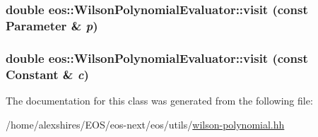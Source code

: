 \label{classeos_1_1WilsonPolynomialEvaluator_a9c91165808b2aee3c8a0db64a99f5c7c}
\hypertarget{classeos_1_1WilsonPolynomialEvaluator_a380ced036f68d89cdf3edde705a32813}{
\subsubsection[{visit}]{\setlength{\rightskip}{0pt plus 5cm}double eos::WilsonPolynomialEvaluator::visit (const {\bf Parameter} \& {\em p})}}
\label{classeos_1_1WilsonPolynomialEvaluator_a380ced036f68d89cdf3edde705a32813}
\hypertarget{classeos_1_1WilsonPolynomialEvaluator_ac85d91d12ce34c628012f7e4ee451359}{
\subsubsection[{visit}]{\setlength{\rightskip}{0pt plus 5cm}double eos::WilsonPolynomialEvaluator::visit (const Constant \& {\em c})}}
\label{classeos_1_1WilsonPolynomialEvaluator_ac85d91d12ce34c628012f7e4ee451359}


The documentation for this class was generated from the following file:\begin{DoxyCompactItemize}
\item 
/home/alexshires/EOS/eos-\/next/eos/utils/\hyperlink{wilson-polynomial_8hh}{wilson-\/polynomial.hh}\end{DoxyCompactItemize}
